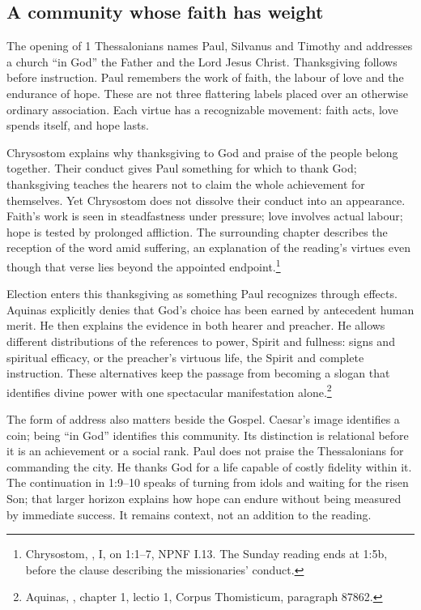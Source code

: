 \subsection{A community whose faith has weight}
The opening of 1 Thessalonians names Paul, Silvanus and Timothy and addresses a church ``in God'' the Father and the Lord Jesus Christ. Thanksgiving follows before instruction. Paul remembers the work of faith, the labour of love and the endurance of hope. These are not three flattering labels placed over an otherwise ordinary association. Each virtue has a recognizable movement: faith acts, love spends itself, and hope lasts.

Chrysostom explains why thanksgiving to God and praise of the people belong together. Their conduct gives Paul something for which to thank God; thanksgiving teaches the hearers not to claim the whole achievement for themselves. Yet Chrysostom does not dissolve their conduct into an appearance. Faith's work is seen in steadfastness under pressure; love involves actual labour; hope is tested by prolonged affliction. The surrounding chapter describes the reception of the word amid suffering, an explanation of the reading's virtues even though that verse lies beyond the appointed endpoint.\footnote{Chrysostom, , I, on 1:1--7, NPNF I.13. The Sunday reading ends at 1:5b, before the clause describing the missionaries' conduct.}

Election enters this thanksgiving as something Paul recognizes through effects. Aquinas explicitly denies that God's choice has been earned by antecedent human merit. He then explains the evidence in both hearer and preacher. He allows different distributions of the references to power, Spirit and fullness: signs and spiritual efficacy, or the preacher's virtuous life, the Spirit and complete instruction. These alternatives keep the passage from becoming a slogan that identifies divine power with one spectacular manifestation alone.\footnote{Aquinas, , chapter 1, lectio 1, Corpus Thomisticum, paragraph 87862.}

The form of address also matters beside the Gospel. Caesar's image identifies a coin; being ``in God'' identifies this community. Its distinction is relational before it is an achievement or a social rank. Paul does not praise the Thessalonians for commanding the city. He thanks God for a life capable of costly fidelity within it. The continuation in 1:9--10 speaks of turning from idols and waiting for the risen Son; that larger horizon explains how hope can endure without being measured by immediate success. It remains context, not an addition to the reading.

